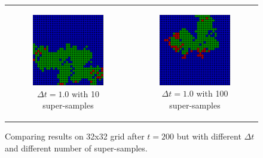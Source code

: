 \begin{figure}
\begin{center}
\begin{tabular}{c c}
		\\

		\begin{subfigure}[b]{0.4\textwidth}
			\centering
			\includegraphics[width=.7\textwidth, angle=0]{./../shared/fig/randomness/SIR_32x32_200time_10delta_ss10.png}
			\caption{$\Delta t = 1.0$ with 10 super-samples}
			\label{fig:sir_abs_timeDeltas_randomness_dt10_ss10}
		\end{subfigure}
		
		&
		
		\begin{subfigure}[b]{0.4\textwidth}
			\centering
			\includegraphics[width=.7\textwidth, angle=0]{./../shared/fig/randomness/SIR_32x32_200time_10delta_ss100.png}
			\caption{$\Delta t = 1.0$ with 100 super-samples}
			\label{fig:sir_abs_timeDeltas_randomness_dt10_ss100}
		\end{subfigure}
	\end{tabular}
	
	\caption{Comparing results on 32x32 grid after $t = 200$ but with different $\Delta t$ and different number of super-samples.}
	\label{fig:sir_abs_timeDeltas_randomness}
\end{center}
\end{figure}

